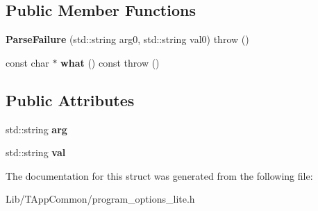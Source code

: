 \subsection*{Public Member Functions}
\begin{DoxyCompactItemize}
\item 
\mbox{\label{structdf_1_1program__options__lite_1_1_parse_failure_a0ba8f498b1be069669a8e77d1209dd4e}} 
{\bfseries Parse\+Failure} (std\+::string arg0, std\+::string val0)  throw ()
\item 
\mbox{\label{structdf_1_1program__options__lite_1_1_parse_failure_a098f417775ffe207902facd3391283b8}} 
const char $\ast$ {\bfseries what} () const  throw ()
\end{DoxyCompactItemize}
\subsection*{Public Attributes}
\begin{DoxyCompactItemize}
\item 
\mbox{\label{structdf_1_1program__options__lite_1_1_parse_failure_a81510e2209fd364c51199b964009ea49}} 
std\+::string {\bfseries arg}
\item 
\mbox{\label{structdf_1_1program__options__lite_1_1_parse_failure_afab39021f047e1de32cd5d81b7b1b463}} 
std\+::string {\bfseries val}
\end{DoxyCompactItemize}


The documentation for this struct was generated from the following file\+:\begin{DoxyCompactItemize}
\item 
Lib/\+T\+App\+Common/program\+\_\+options\+\_\+lite.\+h\end{DoxyCompactItemize}
